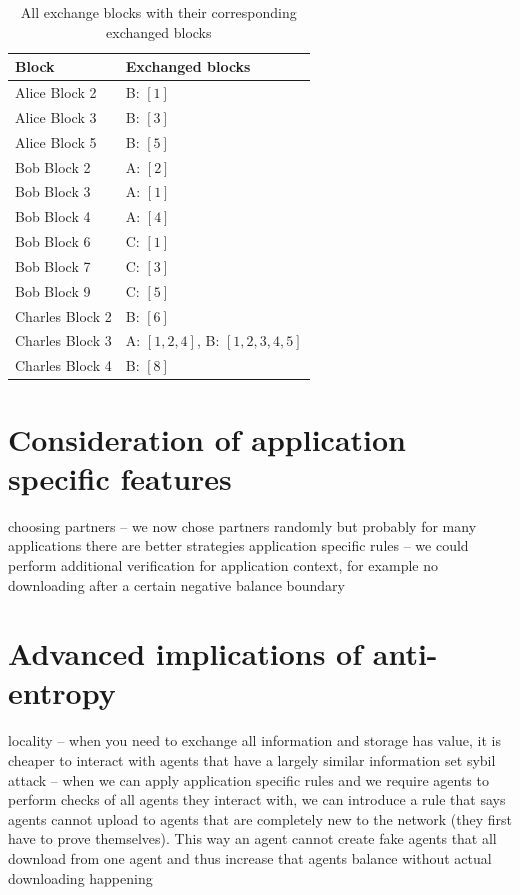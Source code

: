 \begin{table}[h!]
    \centering
    \caption{All exchange blocks with their corresponding exchanged blocks}
    \label{tab:exchange_blocks}
    \begin{tabular}{l| p{5cm}}
        \toprule
        Block & Exchanged blocks \\
        \midrule
        Alice Block 2    & B: $[1]$ \\
        Alice Block 3    & B: $[3]$ \\
        Alice Block 5    & B: $[5]$ \\
        Bob Block 2      & A: $[2]$ \\
        Bob Block 3      & A: $[1]$ \\
        Bob Block 4      & A: $[4]$ \\
        Bob Block 6      & C: $[1]$ \\
        Bob Block 7      & C: $[3]$ \\
        Bob Block 9      & C: $[5]$ \\
        Charles Block 2  & B: $[6]$ \\
        Charles Block 3  & A: $[1, 2, 4]$, B: $[1, 2, 3, 4, 5]$ \\
        Charles Block 4  & B: $[8]$ \\
        \bottomrule
    \end{tabular}
\end{table}

\section{Consideration of application specific features}
choosing partners -- we now chose partners randomly but probably for many applications there are 
better strategies
application specific rules -- we could perform additional verification for application context, for
example no downloading after a certain negative balance boundary

\section{Advanced implications of anti-entropy}
locality -- when you need to exchange all information and storage has value, it is cheaper to 
interact with agents that have a largely similar information set
sybil attack -- when we can apply application specific rules and we require agents to perform checks
of all agents they interact with, we can introduce a rule that says agents cannot upload to agents
that are completely new to the network (they first have to prove themselves). This way an agent 
cannot create fake agents that all download from one agent and thus increase that agents balance 
without actual downloading happening
